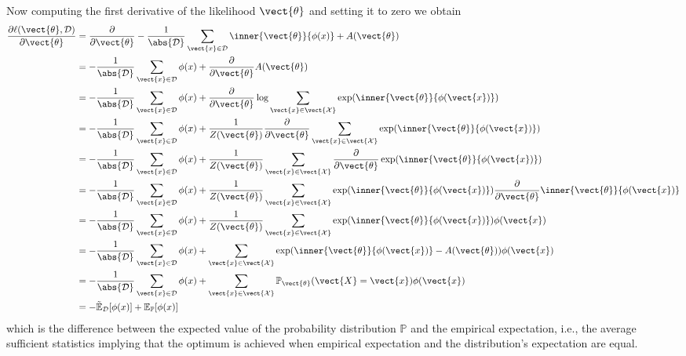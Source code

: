     Now computing the first derivative of the likelihood \wrt $\vect{\theta}$ and setting it to zero we obtain
    \begin{equation}
        \label{eq:likelihood_der}
        \begin{split}
            \frac{\partial \ell(\vect{\theta}, \mathcal{D})}{\partial \vect{\theta}} &=  \frac{\partial}{\partial \vect{\theta}}  - \frac{1}{\abs{\mathcal{D}}} \sum_{\vect{x} \in \mathcal{D}} \inner{\vect{\theta}}{\phi(x)} + A(\vect{\theta})\\
            &= - \frac{1}{\abs{\mathcal{D}}}  \sum_{\vect{x} \in \mathcal{D}} \phi(x) +  \frac{\partial}{\partial \vect{\theta}}  A(\vect{\theta}) \\
            &= - \frac{1}{\abs{\mathcal{D}}}  \sum_{\vect{x} \in \mathcal{D}} \phi(x) +  \frac{\partial}{\partial \vect{\theta}}  \log \sum_{\vect{x} \in \vect{\mathcal{X}}} \exp(\inner{\vect{\theta}}{\phi(\vect{x})})\\
            &= - \frac{1}{\abs{\mathcal{D}}}  \sum_{\vect{x} \in \mathcal{D}} \phi(x) +  \frac{1}{Z(\vect{\theta})}\frac{\partial}{\partial \vect{\theta}}  \sum_{\vect{x} \in \vect{\mathcal{X}}} \exp(\inner{\vect{\theta}}{\phi(\vect{x})})\\
            &= - \frac{1}{\abs{\mathcal{D}}}  \sum_{\vect{x} \in \mathcal{D}} \phi(x) +  \frac{1}{Z(\vect{\theta})} \sum_{\vect{x} \in \vect{\mathcal{X}}}  \frac{\partial}{\partial \vect{\theta}}  \exp(\inner{\vect{\theta}}{\phi(\vect{x})})\\
            &= - \frac{1}{\abs{\mathcal{D}}}  \sum_{\vect{x} \in \mathcal{D}} \phi(x) +  \frac{1}{Z(\vect{\theta})} \sum_{\vect{x} \in \vect{\mathcal{X}}} \exp(\inner{\vect{\theta}}{\phi(\vect{x})}) \frac{\partial}{\partial \vect{\theta}}  \inner{\vect{\theta}}{\phi(\vect{x})}\\
            &= - \frac{1}{\abs{\mathcal{D}}}  \sum_{\vect{x} \in \mathcal{D}} \phi(x) +  \frac{1}{Z(\vect{\theta})} \sum_{\vect{x} \in \vect{\mathcal{X}}} \exp(\inner{\vect{\theta}}{\phi(\vect{x})}) \phi(\vect{x})\\
            &= - \frac{1}{\abs{\mathcal{D}}}  \sum_{\vect{x} \in \mathcal{D}} \phi(x) + \sum_{\vect{x} \in \vect{\mathcal{X}}} \exp(\inner{\vect{\theta}}{\phi(\vect{x})} - A(\vect{\theta})) \phi(\vect{x})\\
            &= - \frac{1}{\abs{\mathcal{D}}}  \sum_{\vect{x} \in \mathcal{D}} \phi(x) + \sum_{\vect{x} \in \vect{\mathcal{X}}} \mathbb{P}_{\vect{\theta}}(\vect{X} = \vect{x}) \phi(\vect{x})\\
            &=  - \tilde{\mathbb{E}}_{\mathcal{D}}[\phi(x)] + \mathbb{E}_{\mathbb{P}}[\phi(x)]
        \end{split}
    \end{equation}
    which is the difference between the expected value of the probability distribution $\mathbb{P}$ and the empirical expectation, i.e., the average sufficient statistics implying that the optimum is achieved when empirical expectation and the distribution's expectation are equal.

